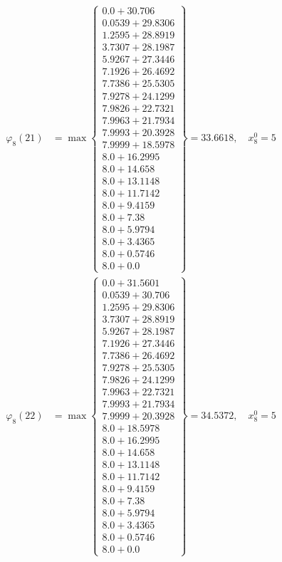 \documentclass{article}
\begin{document}
\begin{align*}
  
  
  
\varphi_{8}(21) &= \max \left\{ \begin{array}{c}
0.0 + 30.706 \\
 0.0539 + 29.8306 \\
 1.2595 + 28.8919 \\
 3.7307 + 28.1987 \\
 5.9267 + 27.3446 \\
 7.1926 + 26.4692 \\
 7.7386 + 25.5305 \\
 7.9278 + 24.1299 \\
 7.9826 + 22.7321 \\
 7.9963 + 21.7934 \\
 7.9993 + 20.3928 \\
 7.9999 + 18.5978 \\
 8.0 + 16.2995 \\
 8.0 + 14.658 \\
 8.0 + 13.1148 \\
 8.0 + 11.7142 \\
 8.0 + 9.4159 \\
 8.0 + 7.38 \\
 8.0 + 5.9794 \\
 8.0 + 3.4365 \\
 8.0 + 0.5746 \\
 8.0 + 0.0
\end{array} \right\}=33.6618,\quad x_{8}^0=5\\
  
  
  
  
\varphi_{8}(22) &= \max \left\{ \begin{array}{c}
0.0 + 31.5601 \\
 0.0539 + 30.706 \\
 1.2595 + 29.8306 \\
 3.7307 + 28.8919 \\
 5.9267 + 28.1987 \\
 7.1926 + 27.3446 \\
 7.7386 + 26.4692 \\
 7.9278 + 25.5305 \\
 7.9826 + 24.1299 \\
 7.9963 + 22.7321 \\
 7.9993 + 21.7934 \\
 7.9999 + 20.3928 \\
 8.0 + 18.5978 \\
 8.0 + 16.2995 \\
 8.0 + 14.658 \\
 8.0 + 13.1148 \\
 8.0 + 11.7142 \\
 8.0 + 9.4159 \\
 8.0 + 7.38 \\
 8.0 + 5.9794 \\
 8.0 + 3.4365 \\
 8.0 + 0.5746 \\
 8.0 + 0.0
\end{array} \right\}=34.5372,\quad x_{8}^0=5\\
  

\end{align*}
\end{document}

